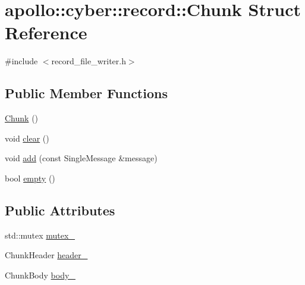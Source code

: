 \hypertarget{structapollo_1_1cyber_1_1record_1_1Chunk}{\section{apollo\-:\-:cyber\-:\-:record\-:\-:Chunk Struct Reference}
\label{structapollo_1_1cyber_1_1record_1_1Chunk}
}


{\ttfamily \#include $<$record\-\_\-file\-\_\-writer.\-h$>$}

\subsection*{Public Member Functions}
\begin{DoxyCompactItemize}
\item 
\hyperlink{structapollo_1_1cyber_1_1record_1_1Chunk_a2cf02bb8d216f44ecff00f4e08c07897}{Chunk} ()
\item 
void \hyperlink{structapollo_1_1cyber_1_1record_1_1Chunk_a05ac768236d95c41080758f19b7d5a98}{clear} ()
\item 
void \hyperlink{structapollo_1_1cyber_1_1record_1_1Chunk_a9f06f76b5e1ea3609f8314cf52dc0899}{add} (const Single\-Message \&message)
\item 
bool \hyperlink{structapollo_1_1cyber_1_1record_1_1Chunk_a9cc10421521b0bb0b3e0c92f3bf5dfed}{empty} ()
\end{DoxyCompactItemize}
\subsection*{Public Attributes}
\begin{DoxyCompactItemize}
\item 
std\-::mutex \hyperlink{structapollo_1_1cyber_1_1record_1_1Chunk_af89d9a0952404a4d3f3877da67b40128}{mutex\-\_\-}
\item 
Chunk\-Header \hyperlink{structapollo_1_1cyber_1_1record_1_1Chunk_a8dbd3eaef5f4c44b84b4003acaa2fc0b}{header\-\_\-}
\item 
Chunk\-Body \hyperlink{structapollo_1_1cyber_1_1record_1_1Chunk_a00672597f6ebfdf2dbeaabd580d9909b}{body\-\_\-}
\end{DoxyCompactItemize}


